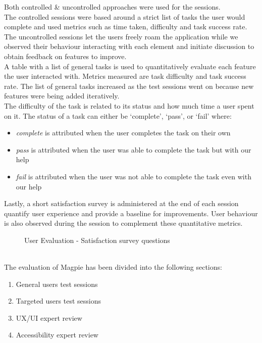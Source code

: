 \noindent Both controlled \& uncontrolled approaches were used for the sessions.\\
The controlled sessions were based around a strict list of tasks the user would complete and used metrics such as time taken, difficulty and task success rate.\\
The uncontrolled sessions let the users freely roam the application while we observed their behaviour interacting with each element and initiate discussion to obtain feedback on features to improve.\\

\noindent A table with a list of general tasks is used to quantitatively evaluate each feature the user interacted with. Metrics measured are task difficulty and task success rate. The list of general tasks increased as the test sessions went on because new features were being added iteratively.\\
The difficulty of the task is related to its status and how much time a user spent on it. The status of a task can either be `complete', `pass', or `fail' where:
\begin{itemize}
    \item \emph{complete} is attributed when the user completes the task on their own
    \item \emph{pass} is attributed when the user was able to complete the task but with our help
    \item \emph{fail} is attributed when the user was not able to complete the task even with our help
\end{itemize}
Lastly, a short satisfaction survey is administered at the end of each session quantify user experience and provide a baseline for improvements. User behaviour is also observed during the session to complement these quantitative metrics.\\
\begin{figure}[h!]
    \centering
    \caption{User Evaluation - Satisfaction survey questions}
\end{figure}\\
The evaluation of Magpie has been divided into the following sections:
\begin{enumerate}
    \item General users test sessions
    \item Targeted users test sessions
    \item UX/UI expert review
    \item Accessibility expert review
\end{enumerate}
